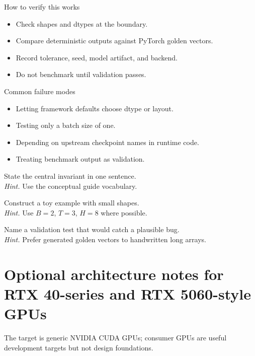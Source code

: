 \begin{verificationbox}{How to verify this works}
\begin{itemize}
\item Check shapes and dtypes at the boundary.
\item Compare deterministic outputs against PyTorch golden vectors.
\item Record tolerance, seed, model artifact, and backend.
\item Do not benchmark until validation passes.
\end{itemize}
\end{verificationbox}

\begin{warningbox}{Common failure modes}
\begin{itemize}
\item Letting framework defaults choose dtype or layout.
\item Testing only a batch size of one.
\item Depending on upstream checkpoint names in runtime code.
\item Treating benchmark output as validation.
\end{itemize}
\end{warningbox}

\begin{chapterexercises}
\item State the central invariant in one sentence.\\
\textit{Hint.} Use the conceptual guide vocabulary.
\item Construct a toy example with small shapes.\\
\textit{Hint.} Use $B=2$, $T=3$, $H=8$ where possible.
\item Name a validation test that would catch a plausible bug.\\
\textit{Hint.} Prefer generated golden vectors to handwritten long arrays.
\end{chapterexercises}

\chapter{Optional architecture notes for RTX 40-series and RTX 5060-style GPUs}
\label{ch:rtx-notes}
The target is generic NVIDIA CUDA GPUs; consumer GPUs are useful development targets but not design foundations. \citep{nvidiaRtx40,nvidiaRtx5060,cudaProgrammingGuide}




